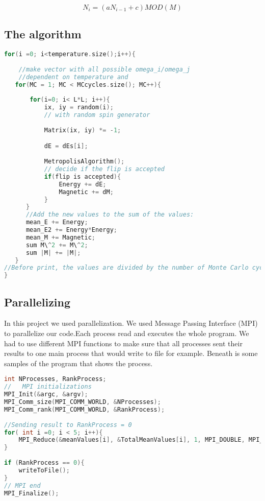 \begin{equation}\label{eq:linearcr}
N_i = (aN_{i-1} + c)MOD(M)
\end{equation}

\subsection{The algorithm}



\begin{lstlisting}[language=C++]
for(i =0; i<temperature.size();i++){
    
    //make vector with all possible omega_i/omega_j   
    //dependent on temperature and
   for(MC = 1; MC < MCcycles.size(); MC++){
       
       for(i=0; i< L*L; i++){
           ix, iy = random(i);
           // with random spin generator        
           
           Matrix(ix, iy) *= -1;

           dE = dEs[i];
           
           MetropolisAlgorithm();
           // decide if the flip is accepted
           if(flip is accepted){
               Energy += dE;
               Magnetic += dM;
           }
      }
      //Add the new values to the sum of the values:
      mean_E += Energy;
      mean_E2 += Energy*Energy;
      mean_M += Magnetic;
      sum M\^2 += M\^2;
      sum |M| += |M|;
   }
//Before print, the values are divided by the number of Monte Carlo cycles to find the mean values.
}
\end{lstlisting}

\subsection{Parallelizing}

In this project we used parallelization. We used Message Passing Interface (MPI) to parallelize our code.Each process read and executes the whole program. We had to use different MPI functions to make sure that all processes sent their results to one main process that would write to file for example. Beneath is some samples of the program that shows the process. 

\begin{lstlisting}[language=C++]
int NProcesses, RankProcess;
//   MPI initializations
MPI_Init(&argc, &argv);
MPI_Comm_size(MPI_COMM_WORLD, &NProcesses);
MPI_Comm_rank(MPI_COMM_WORLD, &RankProcess);
 
//Sending result to RankProcess = 0
for( int i =0; i < 5; i++){
    MPI_Reduce(&meanValues[i], &TotalMeanValues[i], 1, MPI_DOUBLE, MPI_SUM, 0, MPI_COMM_WORLD);
}
    
if (RankProcess == 0){
    writeToFile();
}
// MPI end     
MPI_Finalize();
\end{lstlisting}

